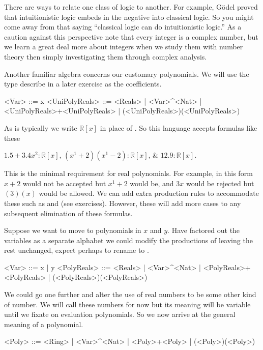 \begin{remark}
    There are ways to relate one class of logic to another. 
    For example, G\"odel proved that intuitionistic logic embeds
    in the negative into classical logic.  So you 
    might come away from that saying ``classical logic can do 
    intuitionistic logic.''   As a caution against this perspective note that every integer is 
    a complex number, but we learn a great deal more about integers when we 
    study them with number theory then simply investigating them 
    through complex analysis. 
\end{remark}


Another familiar algebra concerns our customary polynomials.  We will use 
the type  describe in a later exercise as the coefficients.
\begin{Gcode}[]
    <Var>  ::= x 
    <UniPolyReals> ::= <Reals>
            | <Var>^<Nat>
            | <UniPolyReals>+<UniPolyReals>
            | (<UniPolyReals>)(<UniPolyReals>)
\end{Gcode}
As is typically  we write $\mathbb{R}[x]$ in place 
of .  So this language accepts formulas like these 
\begin{center}
    $1.5+3.4x^2:\mathbb{R}[x]$,
    $(x^1+2)(x^1-2):\mathbb{R}[x]$, \&
    $12.9:\mathbb{R}[x]$.
\end{center}
This is the minimal requirement for real polynomials.
For example, in this form $x+2$ would not be accepted but 
$x^1+2$ would be, and $3x$ would be rejected but $(3)(x)$ would 
be allowed.  We can add extra production rules to accommodate these 
such as  and  (see exercises).  However, 
these will add more cases to any subsequent elimination of these formulas.

Suppose we want to move to polynomials in $x$ and $y$.  Have factored out 
the variables as a separate alphabet we could modify the productions of 
 leaving the rest unchanged, expect perhaps to rename 
 to .
\begin{Gcode}[]
    <Var>  ::= x | y
    <PolyReals> ::= <Reals>
            | <Var>^<Nat>
            | <PolyReals>+<PolyReals>
            | (<PolyReals>)(<PolyReals>)
\end{Gcode}
We could go one further and alter the use of real numbers to be some other 
kind  of number.  We will call these numbers  for now but its 
meaning will be variable until we fixate on evaluation polynomials.
So we now arrive at the general meaning of a polynomial.
\begin{Gcode}[]
    <Poly> ::= <Ring>
            | <Var>^<Nat>
            | <Poly>+<Poly>
            | (<Poly>)(<Poly>)
\end{Gcode}

